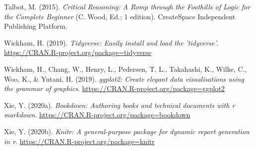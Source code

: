 \documentclass[
  a4paper,11pt,twoside,onecolumn,openright,final,oldfontcommands]{memoir}
\newlength{\cslhangindent}
\newlength{\cslentryspacingunit} %
\newenvironment{CSLReferences}[2] %
 {%
  \setlength{\parindent}{0pt}
  \ifodd #1
  \let\oldpar\par
  \def\par{\hangindent=\cslhangindent\oldpar}
  \fi
  \setlength{\parskip}{#2\cslentryspacingunit}
 }%
 {}
\theoremstyle{definition}
\theoremstyle{definition}
\theoremstyle{definition}
\theoremstyle{definition}
\theoremstyle{remark}
\begin{document}
\begin{CSLReferences}{1}{0}
\leavevmode{}%
Talbot, M. (2015). \emph{Critical {Reasoning}: {A} {Romp} through the {Foothills} of {Logic} for the {Complete} {Beginner}} (C. Wood, Ed.; 1 edition). CreateSpace Independent Publishing Platform.

\leavevmode{}%
Wickham, H. (2019). \emph{Tidyverse: Easily install and load the 'tidyverse'}. \url{https://CRAN.R-project.org/package=tidyverse}

\leavevmode{}%
Wickham, H., Chang, W., Henry, L., Pedersen, T. L., Takahashi, K., Wilke, C., Woo, K., \& Yutani, H. (2019). \emph{ggplot2: Create elegant data visualisations using the grammar of graphics}. \url{https://CRAN.R-project.org/package=ggplot2}

\leavevmode{}%
Xie, Y. (2020a). \emph{Bookdown: Authoring books and technical documents with r markdown}. \url{https://CRAN.R-project.org/package=bookdown}

\leavevmode{}%
Xie, Y. (2020b). \emph{Knitr: A general-purpose package for dynamic report generation in r}. \url{https://CRAN.R-project.org/package=knitr}

\end{CSLReferences}
\end{document}
